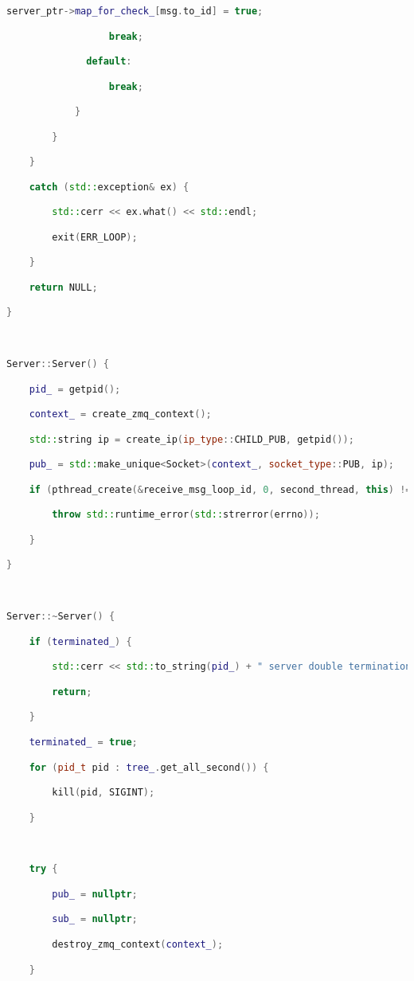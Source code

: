 \begin{lstlisting}[language=C++]
                  server_ptr->map_for_check_[msg.to_id] = true;

                  break;

              default:

                  break;

            }

        }

    } 

    catch (std::exception& ex) {

        std::cerr << ex.what() << std::endl;

        exit(ERR_LOOP);

    }

    return NULL;

}



Server::Server() {

    pid_ = getpid();

    context_ = create_zmq_context();

    std::string ip = create_ip(ip_type::CHILD_PUB, getpid());

    pub_ = std::make_unique<Socket>(context_, socket_type::PUB, ip);

    if (pthread_create(&receive_msg_loop_id, 0, second_thread, this) != 0) {

        throw std::runtime_error(std::strerror(errno));

    }

}



Server::~Server() {

    if (terminated_) {

        std::cerr << std::to_string(pid_) + " server double termination" << std::endl;

        return;

    }

    terminated_ = true;

    for (pid_t pid : tree_.get_all_second()) {

        kill(pid, SIGINT);

    }



    try {

        pub_ = nullptr;

        sub_ = nullptr;

        destroy_zmq_context(context_);

    } 


\end{lstlisting}
